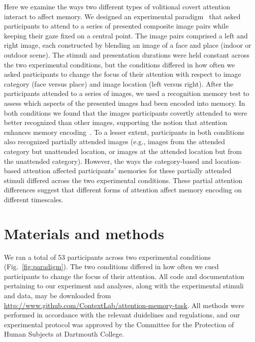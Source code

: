 \documentclass[english]{article}
\begin{document}
Here we examine the ways two different types of volitional covert attention
interact to affect memory. We designed an experimental
paradigm~\citep[following][]{Posn80} that asked participants to attend to a
series of presented composite image pairs while keeping their gaze fixed on a
central point. The image pairs comprised a left and right image, each
constructed by blending an image of a face and place (indoor or outdoor scene).
The stimuli and presentation durations were held constant across the two
experimental conditions, but the conditions differed in how often we asked
participants to change the focus of their attention with respect to image
category (face versus place) and image location (left versus right). After the
participants attended to a series of images, we used a recognition memory test
to assess which aspects of the presented images had been encoded into memory.
In both conditions we found that the images participants covertly attended to
were better recognized than other images, supporting the notion that attention
enhances memory encoding~\citep[i.e., they rated attended images as more
familiar than unattended images;][]{Yone02}. To a lesser extent, participants
in both conditions also recognized partially attended images (e.g., images from
the attended category but unattended location, or images at the attended
location but from the unattended category). However, the ways the
category-based and location-based attention affected participants' memories for
these partially attended stimuli differed across the two experimental conditions.
These partial attention differences suggest that different forms of attention
affect memory encoding on different timescales.

\section*{Materials and methods}

We ran a total of 53 participants across two experimental conditions
(Fig.~\ref{fig:paradigm}). The two conditions differed in how often we cued
participants to change the focus of their attention. All code and documentation
pertaining to our experiment and analyses, along with the experimental stimuli
and data, may be downloaded from
\url{http://www.github.com/ContextLab/attention-memory-task}. All methods were
performed in accordance with the relevant duidelines and regulations, and our
experimental protocol was approved by the Committee for the Protection of Human
Subjects at Dartmouth College.
\end{document}
